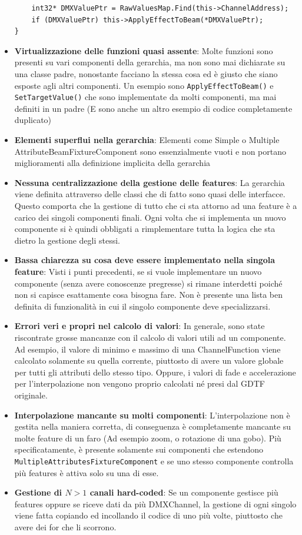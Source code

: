 \documentclass[main.tex]{subfiles}
\begin{document}
\begin{itemize}
\begin{lstlisting}
	int32* DMXValuePtr = RawValuesMap.Find(this->ChannelAddress);
	if (DMXValuePtr) this->ApplyEffectToBeam(*DMXValuePtr);
}
\end{lstlisting}
    \item \textbf{Virtualizzazione delle funzioni quasi assente}: Molte funzioni sono presenti su vari componenti della gerarchia, ma non sono mai dichiarate su una classe padre, nonostante facciano la stessa cosa ed è giusto che siano esposte agli altri componenti. Un esempio sono \lstinline{ApplyEffectToBeam()} e \lstinline{SetTargetValue()} che sono implementate da molti componenti, ma mai definiti in un padre (E sono anche un altro esempio di codice completamente duplicato) 
    \item \textbf{Elementi superflui nella gerarchia}: Elementi come Simple o Multiple AttributeBeamFixtureComponent sono essenzialmente vuoti e non portano miglioramenti alla definizione implicita della gerarchia %
    \item \textbf{Nessuna centralizzazione della gestione delle features}: La gerarchia viene definita attraverso delle classi che di fatto sono quasi delle interfacce. Questo comporta che la gestione di tutto che ci sta attorno ad una feature è a carico dei singoli componenti finali. Ogni volta che si implementa un nuovo componente si è quindi obbligati a rimplementare tutta la logica che sta dietro la gestione degli stessi.
    \item \textbf{Bassa chiarezza su cosa deve essere implementato nella singola feature}: Visti i punti precedenti, se si vuole implementare un nuovo componente (senza avere conoscenze pregresse) si rimane interdetti poiché non si capisce esattamente cosa bisogna fare. Non è presente una lista ben definita di funzionalità in cui il singolo componente deve specializzarsi.
    \item \textbf{Errori veri e propri nel calcolo di valori}: In generale, sono state riscontrate grosse mancanze con il calcolo di valori utili ad un componente. Ad esempio, il valore di minimo e massimo di una ChannelFunction viene calcolato solamente su quella corrente, piuttosto di avere un valore globale per tutti gli attributi dello stesso tipo. Oppure, i valori di fade e accelerazione per l'interpolazione non vengono proprio calcolati né presi dal GDTF originale.
    \item \textbf{Interpolazione mancante su molti componenti}: L'interpolazione non è gestita nella maniera corretta, di conseguenza è completamente mancante su molte feature di un faro (Ad esempio zoom, o rotazione di una gobo). Più specificatamente, è presente solamente sui componenti che estendono \lstinline{MultipleAttributesFixtureComponent} e se uno stesso componente controlla più features è attiva solo su una di esse.
    \item \textbf{Gestione di $N > 1$ canali hard-coded}: Se un componente gestisce più features oppure se riceve dati da più DMXChannel, la gestione di ogni singolo viene fatta copiando ed incollando il codice di uno più volte, piuttosto che avere dei for che li scorrono.
\end{itemize}
\end{document}
